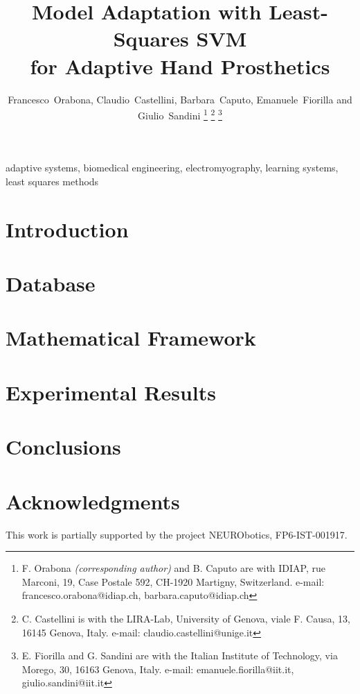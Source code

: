 \documentclass[conference,letterpaper]{IEEEtran}
\begin{document}

\title{Model Adaptation with Least-Squares SVM\\for Adaptive Hand Prosthetics}

\author{Francesco~Orabona, Claudio~Castellini, Barbara~Caputo, Emanuele~Fiorilla and Giulio~Sandini
\thanks{F. Orabona \emph{(corresponding author)} and B. Caputo
  are with IDIAP,
  rue Marconi, 19, Case Postale 592, CH-1920 Martigny, Switzerland.
  e-mail: francesco.orabona@idiap.ch, barbara.caputo@idiap.ch}%
\thanks{C. Castellini
  is with the LIRA-Lab, University of Genova,
  viale F. Causa, 13, 16145 Genova, Italy.
  e-mail: claudio.castellini@unige.it}%
\thanks{E. Fiorilla and G. Sandini
  are with the Italian Institute of Technology,
  via Morego, 30, 16163 Genova, Italy.
  e-mail: emanuele.fiorilla@iit.it, giulio.sandini@iit.it}%
}

\maketitle

\begin{abstract}
  
\end{abstract}

\begin{IEEEkeywords}
  adaptive systems, biomedical engineering, electromyography,
  learning systems, least squares methods
\end{IEEEkeywords}

\IEEEpeerreviewmaketitle


\section{Introduction}
\label{sec:intro}


\section{Database}
\label{sec:mms}


\section{Mathematical Framework}
\label{sec:math}


\section{Experimental Results}
\label{sec:exp}


\section{Conclusions}
\label{sec:concl}



\section*{Acknowledgments}

This work is partially supported by the project NEURObotics,
FP6-IST-001917.

{\small


}
\end{document}
